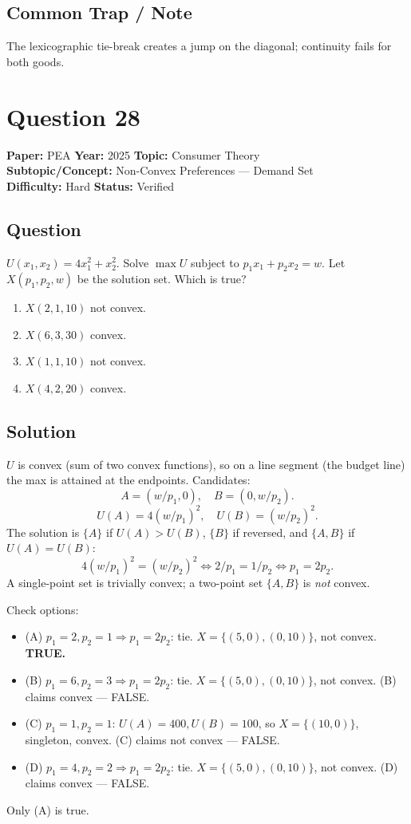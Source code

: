 \documentclass[11pt]{article}
\begin{document}
\subsection*{Common Trap / Note}
The lexicographic tie-break creates a jump on the diagonal; continuity fails for both goods.

\section*{Question 28}
\textbf{Paper:} PEA \quad \textbf{Year:} 2025 \quad \textbf{Topic:} Consumer Theory \\
\textbf{Subtopic/Concept:} Non-Convex Preferences --- Demand Set \\
\textbf{Difficulty:} Hard \quad \textbf{Status:} Verified

\subsection*{Question}
$U(x_1,x_2) = 4 x_1^2 + x_2^2$. Solve $\max U$ subject to $p_1 x_1 + p_2 x_2 = w$. Let $X(p_1, p_2, w)$ be the solution set. Which is true?

\begin{enumerate}[label=(\Alph*)]
\item $X(2,1,10)$ not convex.
\item $X(6,3,30)$ convex.
\item $X(1,1,10)$ not convex.
\item $X(4,2,20)$ convex.
\end{enumerate}

\subsection*{Solution}
$U$ is convex (sum of two convex functions), so on a line segment (the budget line) the max is attained at the endpoints. Candidates:
\[
A = (w/p_1, 0), \quad B = (0, w/p_2).
\]
\[
U(A) = 4(w/p_1)^2,\quad U(B) = (w/p_2)^2.
\]
The solution is $\{A\}$ if $U(A) > U(B)$, $\{B\}$ if reversed, and $\{A, B\}$ if $U(A) = U(B)$:
\[
4(w/p_1)^2 = (w/p_2)^2 \iff 2/p_1 = 1/p_2 \iff p_1 = 2 p_2.
\]
A single-point set is trivially convex; a two-point set $\{A, B\}$ is \emph{not} convex.

Check options:
\begin{itemize}[leftmargin=*]
\item (A) $p_1 = 2, p_2 = 1 \Rightarrow p_1 = 2 p_2$: tie. $X = \{(5,0), (0,10)\}$, not convex. \textbf{TRUE.}
\item (B) $p_1 = 6, p_2 = 3 \Rightarrow p_1 = 2 p_2$: tie. $X = \{(5,0), (0,10)\}$, not convex. (B) claims convex --- FALSE.
\item (C) $p_1 = 1, p_2 = 1$: $U(A) = 400, U(B) = 100$, so $X = \{(10,0)\}$, singleton, convex. (C) claims not convex --- FALSE.
\item (D) $p_1 = 4, p_2 = 2 \Rightarrow p_1 = 2 p_2$: tie. $X = \{(5,0),(0,10)\}$, not convex. (D) claims convex --- FALSE.
\end{itemize}
Only (A) is true.
\end{document}
